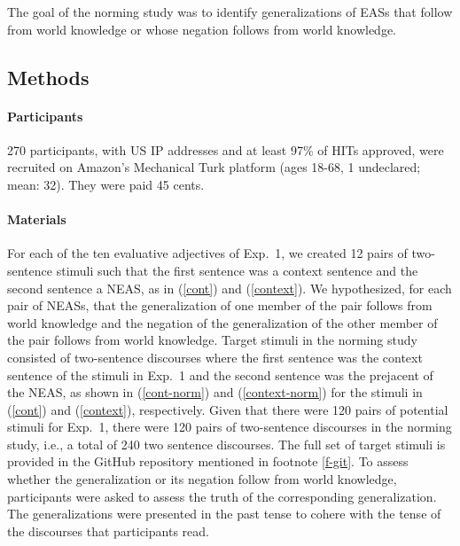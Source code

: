 \documentclass[11pt,fleqn]{article}
\newcommand{\6}{\mbox{$[\hspace*{-.6mm}[$}}
\newcommand{\9}{\mbox{$]\hspace*{-.6mm}]$}}
\begin{document}
The goal of the norming study was to identify generalizations of EASs that follow from world knowledge or whose negation follows from world knowledge. 

\subsection{Methods}

\paragraph{Participants} 270 participants, with US IP addresses and at least 97\% of HITs approved, were recruited on Amazon's Mechanical Turk platform (ages 18-68, 1 undeclared; mean: 32). They were paid 45 cents.


\paragraph{Materials} For each of the ten evaluative adjectives of Exp.~1, we created 12 pairs of two-sentence stimuli such that the first sentence was a context sentence and the second sentence a NEAS, as in (\ref{cont}) and (\ref{context}). We hypothesized, for each pair of NEASs, that the generalization of one member of the pair follows from world knowledge and the negation of the generalization of the other member of the pair follows from world knowledge. Target stimuli in the norming study consisted of two-sentence discourses where the first sentence was the context sentence of the stimuli in Exp.~1 and the second sentence was the prejacent of the NEAS, as shown in (\ref{cont-norm}) and (\ref{context-norm}) for the stimuli in (\ref{cont}) and (\ref{context}), respectively. Given that there were 120 pairs of potential stimuli for Exp.~1, there were 120 pairs of two-sentence discourses in the norming study, i.e., a total of 240 two sentence discourses. The full set of target stimuli is provided in the GitHub repository mentioned in footnote \ref{f-git}. To assess whether the generalization or its negation follow from world knowledge, participants were asked to assess the truth of the corresponding generalization. The generalizations were presented in the past tense to cohere with the tense of the discourses that participants read.
\end{document}
